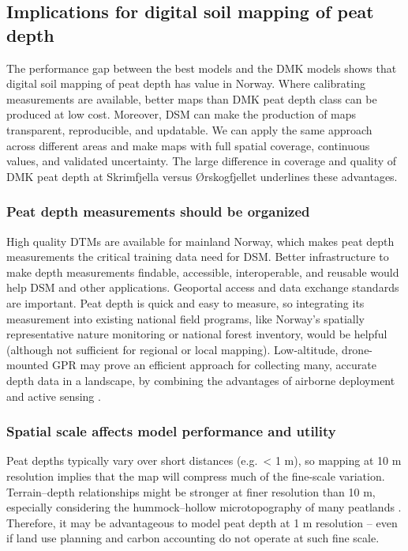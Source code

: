 \documentclass[soil, manuscript]{copernicus}
\begin{document}
\subsection{Implications for digital soil mapping of peat depth}

The performance gap between the best models and the DMK models shows that digital soil mapping of peat depth has value in Norway.
Where calibrating measurements are available, better maps than DMK peat depth class can be produced at low cost.
Moreover, DSM can make the production of maps transparent, reproducible, and updatable.
We can apply the same approach across different areas and make maps with full spatial coverage, continuous values, and validated uncertainty.
The large difference in coverage and quality of DMK peat depth at Skrimfjella versus Ørskogfjellet underlines these advantages.

\subsubsection{Peat depth measurements should be organized}

High quality DTMs are available for mainland Norway, which makes peat depth measurements the critical training data need for DSM.
Better infrastructure to make depth measurements findable, accessible, interoperable, and reusable would help DSM and other applications.
Geoportal access and data exchange standards \citeyearpar[like Natural England's for peat surveys,][]{naturalenglandDataExchangeStandard2023} are important.
Peat depth is quick and easy to measure, so integrating its measurement into existing national field programs, like Norway's spatially representative nature monitoring or national forest inventory, would be helpful (although not sufficient for regional or local mapping).
Low-altitude, drone-mounted GPR may prove an efficient approach for collecting many, accurate depth data in a landscape, by combining the advantages of airborne deployment and active sensing \citep{pelletierPeatAnalysesHudson1991, ruolsDevelopmentDronebasedGroundpenetrating2023}.

\subsubsection{Spatial scale affects model performance and utility}

Peat depths typically vary over short distances (e.g.~\textless{} 1 m), so mapping at 10 m resolution implies that the map will compress much of the fine-scale variation.
Terrain--depth relationships might be stronger at finer resolution than 10 m, especially considering the hummock--hollow microtopography of many peatlands \citep{rydin7Mires1999, lindsayPeatbogsCarbonCritical2010}.
Therefore, it may be advantageous to model peat depth at 1 m resolution -- even if land use planning and carbon accounting do not operate at such fine scale.
\end{document}
